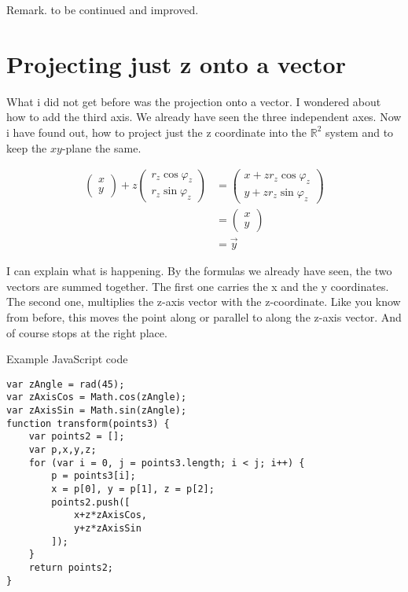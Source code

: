 \documentclass[a4paper]{article}
\begin{document}
Remark. to be continued and improved.


\section{Projecting just z onto a vector}

\label{projecting_just_z}
What i did not get before was the projection onto a vector. I wondered about how to add the third axis. We already have seen the three independent axes. Now i have found out, how to project just the z coordinate into the $\mathbb{R}^{2}$ system and to keep the $xy$-plane the same. 

\begin{displaymath}
\begin{align}
\begin{pmatrix}x\\y\end{pmatrix} + z\begin{pmatrix}r_z\cos\varphi_z\\r_z\sin\varphi_z\end{pmatrix} &= \begin{pmatrix}x+zr_{z}\cos\varphi_z\\y+zr_{z}\sin\varphi_z\end{pmatrix}\\ &= \begin{pmatrix}x\\y\end{pmatrix}\\ &= \vec{y}
\end{align}
\end{displaymath}

I can explain what is happening. By the formulas we already have seen, the two vectors are summed together. The first one carries the x and the y coordinates. The second one, multiplies the z-axis vector with the z-coordinate. Like you know from before, this moves the point along or parallel to along the z-axis vector. And of course stops at the right place.


\begin{example}
Example JavaScript code
\begin{lstlisting}
var zAngle = rad(45);
var zAxisCos = Math.cos(zAngle);
var zAxisSin = Math.sin(zAngle);
function transform(points3) {
    var points2 = [];
    var p,x,y,z;
    for (var i = 0, j = points3.length; i < j; i++) {
        p = points3[i];
        x = p[0], y = p[1], z = p[2];
        points2.push([
            x+z*zAxisCos,
            y+z*zAxisSin
        ]);
    }
    return points2;
}
\end{lstlisting}
\end{example}
\end{document}
